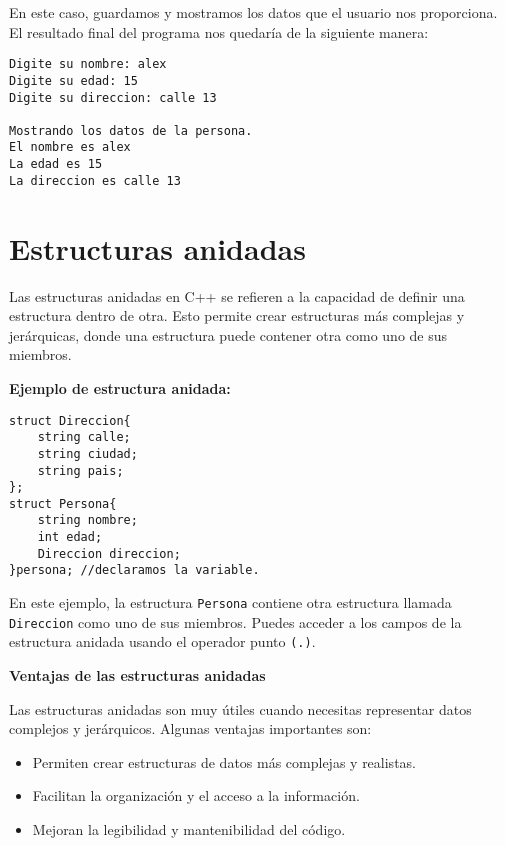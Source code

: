 \documentclass[
  11pt,
  a4paper,
  DIV=11,
  numbers=noendperiod]{scrreprt}
\providecommand{\tightlist}{%
  \setlength{\itemsep}{0pt}\setlength{\parskip}{0pt}}
\begin{document}
En este caso, guardamos y mostramos los datos que el usuario nos
proporciona. El resultado final del programa nos quedaría de la
siguiente manera:

\begin{tcolorbox}[custombox]
\begin{verbatim}
Digite su nombre: alex
Digite su edad: 15
Digite su direccion: calle 13

Mostrando los datos de la persona.
El nombre es alex
La edad es 15
La direccion es calle 13
\end{verbatim}
\end{tcolorbox}

\section{Estructuras anidadas}\label{estructuras-anidadas}

Las estructuras anidadas en C++ se refieren a la capacidad de definir
una estructura dentro de otra. Esto permite crear estructuras más
complejas y jerárquicas, donde una estructura puede contener otra como
uno de sus miembros.

\textbf{Ejemplo de estructura anidada:}

\begin{tcolorbox}[custombox]
\begin{verbatim}
struct Direccion{
    string calle;
    string ciudad;
    string pais;
};
struct Persona{
    string nombre;
    int edad;
    Direccion direccion;
}persona; //declaramos la variable.
\end{verbatim}
\end{tcolorbox}

En este ejemplo, la estructura \texttt{Persona} contiene otra estructura
llamada \texttt{Direccion} como uno de sus miembros. Puedes acceder a
los campos de la estructura anidada usando el operador punto
\texttt{(.)}.

\textbf{Ventajas de las estructuras anidadas}

Las estructuras anidadas son muy útiles cuando necesitas representar
datos complejos y jerárquicos. Algunas ventajas importantes son:

\begin{itemize}
\tightlist
\item
  Permiten crear estructuras de datos más complejas y realistas.
\item
  Facilitan la organización y el acceso a la información.
\item
  Mejoran la legibilidad y mantenibilidad del código.
\end{itemize}
\end{document}
